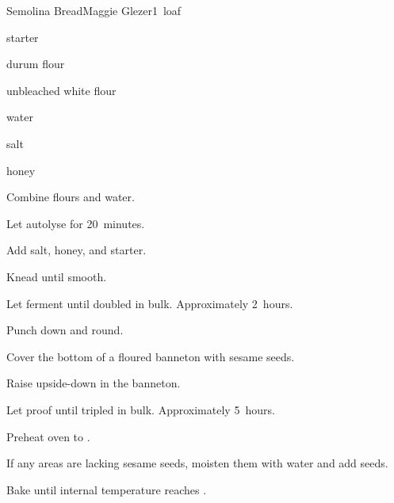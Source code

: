 \begin{recipe}{Semolina Bread}{Maggie Glezer}{1~loaf}

\begin{ingredients}
\item {} starter
\item {} durum flour
\item {} unbleached white flour
\item {} water
\item {} salt
\item {} honey
\item {}
\end{ingredients}

\begin{directions}
\item Combine flours and water.
\item Let autolyse for 20~minutes.
\item Add salt, honey, and starter.
\item Knead until smooth.
\item Let ferment until doubled in bulk. Approximately 2~hours.
\item Punch down and round.
\item Cover the bottom of a floured banneton with sesame seeds.
\item Raise upside-down in the banneton.
\item Let proof until tripled in bulk. Approximately 5~hours.
\item Preheat oven to .
\item If any areas are lacking sesame seeds, moisten them with water and add seeds.
\item Bake until internal temperature reaches .
\end{directions}
\end{recipe}
